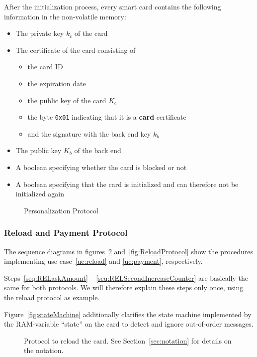 \documentclass{article}
\begin{document}
After the initialization process, every smart card contains the following information in the non-volatile memory:
\begin{itemize}
    \item The private key $k_c$ of the card
    \item The certificate of the card consisting of
    \begin{itemize}
        \item the card ID
        \item the expiration date
        \item the public key of the card $K_c$
        \item the byte \texttt{0x01} indicating that it is a \textbf{card} certificate
        \item and the signature with the back end key $k_b$
    \end{itemize}
    \item The public key $K_b$ of the back end
    \item A boolean specifying whether the card is blocked or not
    \item A boolean specifying that the card is initialized and can therefore not be initialized again
\end{itemize}

 \begin{figure}[h!]
     \centering
     
     \caption{Personalization Protocol}
     \label{fig:PersonProtocol}
 \end{figure}

\subsubsection{Reload and Payment Protocol}
The sequence diagrams in figures~\ref{fig:POSProtocol} and~\ref{fig:ReloadProtocol} show the procedures implementing use case~\ref{uc:reload} and \ref{uc:payment}, respectively.

Steps~\ref{seq:RELaskAmount} -- \ref{seq:RELSecondIncreaseCounter} are basically the same for both protocols.
We will therefore explain these steps only once, using the reload protocol as example.

Figure~\ref{fig:stateMachine} additionally clarifies the state machine implemented by the  RAM-variable ``state'' on the card to detect and ignore out-of-order messages.

\begin{figure}
    \centering
    
    \vspace*{-12pt}
    \caption{Protocol to reload the card.
    See Section~\ref{sec:notation} for details on the notation.
    }
    \label{fig:POSProtocol}
\end{figure}
\end{document}
